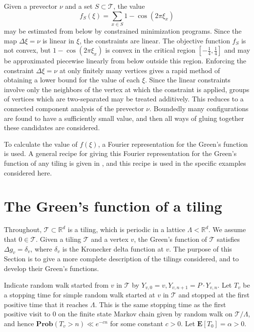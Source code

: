 \documentclass[a4paper, 12pt, notitlepage]{amsart}
\newcommand{\bR}{\mathbb{R}}
\newcommand{\E}{\mathbf{E}}
\newcommand{\Prob}{\mathbf{Prob}}
\newcommand{\sT}{\mathscr{T}}
\theoremstyle{remark}
\begin{document}
Given a prevector $\nu$ and a set $S\subset \sT$, the value
\[
 f_S(\xi) = \sum_{x \in S}1-\cos(2\pi \xi_x)
\]
may be estimated from below by constrained minimization programs.  Since the map $\Delta \xi = \nu$ is linear in $\xi$, the constraints are linear.  The objective function $f_S$ is not convex, but $1 - \cos(2\pi \xi_x)$ is convex in the critical region $[-\frac{1}{4}, \frac{1}{4}]$ and may be approximated piecewise linearly from below outside this region.  Enforcing the constraint $\Delta \xi = \nu$ at only finitely many vertices gives a rapid method of obtaining a lower bound for the value of each $\xi$.  Since the linear constraints involve only the neighbors of the vertex at which the constraint is applied, groups of vertices which are two-separated may be treated additively.  This reduces to a connected component analysis of the prevector $\nu$.  Boundedly many configurations are found to have a sufficiently small value, and then all ways of gluing together these candidates are considered.

To calculate the value of $f(\xi)$, a Fourier representation for the Green's function is used.  A general recipe for giving this Fourier representation for the Green's function of any tiling is given in \cite{HS19}, and this recipe is used in the specific examples considered here.


\section{The Green's function of a tiling}\label{Greens_function_section} 
Throughout, $\sT \subset \bR^d$ is a tiling, which is periodic in a lattice $\Lambda < \bR^d$.  We assume that $0 \in \sT$.
Given a tiling $\sT$ and a vertex $v$, the Green's function of $\sT$ satisfies $\Delta g_v = \delta_v$, where $\delta_v$ is the Kronecker delta function at $v$.  The purpose of this Section is to give a more complete description of the tilings considered, and to develop their Green's functions. 



Indicate random walk started from $v$ in $\sT$ by
$Y_{v,0} = v, Y_{v,n+1} = P \cdot Y_{v,n}$. Let $T_v$ be a stopping time for simple random walk started at $v$ in $\sT$ and stopped at the first positive time that it reaches $\Lambda$.  This is the same stopping time as the first positive visit to 0 on the finite state Markov chain given by random walk on $\sT/\Lambda$, and hence $\Prob(T_v > n) \ll e^{-cn}$ for some constant $c > 0$.  Let $\E[T_0] = \alpha > 0$.   
\end{document}
